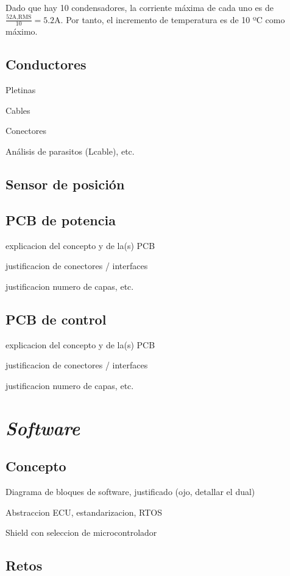 Dado que hay 10 condensadores, la corriente máxima de cada uno es de $\frac{52 \text{A,RMS}}{10} = 5.2 \text{A}$. Por tanto, el incremento de temperatura es de 10 ºC como máximo.

\subsection{Conductores}

Pletinas

Cables

Conectores

Análisis de parasitos (Lcable), etc.

\subsection{Sensor de posición}

\subsection{PCB de potencia}

explicacion del concepto y de la(s) PCB

justificacion de conectores / interfaces

justificacion numero de capas, etc.

\subsection{PCB de control}

explicacion del concepto y de la(s) PCB

justificacion de conectores / interfaces

justificacion numero de capas, etc.


\section{\textit{Software}}

\subsection{Concepto}

Diagrama de bloques de software, justificado (ojo, detallar el dual)

Abstraccion ECU, estandarizacion, RTOS

Shield con seleccion de microcontrolador


\subsection{Retos}

